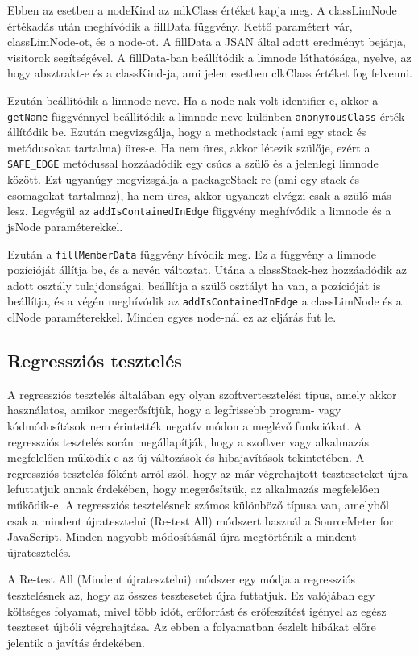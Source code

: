 Ebben az esetben a nodeKind az ndkClass értéket kapja meg.
A classLimNode értékadás után meghívódik a fillData függvény.
Kettő paramétert vár, classLimNode-ot, és a node-ot.
A fillData a JSAN által adott eredményt bejárja, visitorok segítségével.
A fillData-ban beállítódik a limnode láthatósága, nyelve, az hogy absztrakt-e és a classKind-ja, ami jelen esetben clkClass értéket fog felvenni.

Ezután beállítódik a limnode neve. Ha a node-nak volt identifier-e, akkor a \texttt{getName} függvénnyel beállítódik a limnode neve különben \texttt{anonymousClass} érték állítódik be.
Ezután megvizsgálja, hogy a methodstack (ami egy stack és metódusokat tartalma) üres-e.
Ha nem üres, akkor létezik szülője, ezért a \texttt{SAFE\_EDGE} metódussal hozzáadódik egy csúcs a szülő és a jelenlegi limnode között.
Ezt ugyanúgy megvizsgálja a  packageStack-re (ami egy stack és csomagokat tartalmaz), ha nem üres, akkor ugyanezt elvégzi csak a szülő más lesz.
Legvégül az \texttt{addIsContainedInEdge} függvény meghívódik a limnode és a jsNode paraméterekkel.


Ezután a \texttt{fillMemberData} függvény hívódik meg.
Ez a függvény a limnode pozícióját állítja be, és a nevén változtat.
Utána a classStack-hez hozzáadódik az adott osztály tulajdonságai, beállítja a szülő osztályt ha van, a pozícióját is beállítja, és a végén meghívódik az \texttt{addIsContainedInEdge} a classLimNode és a clNode paraméterekkel.
Minden egyes node-nál ez az eljárás fut le.

\subsection{Regressziós tesztelés}
A regressziós tesztelés általában egy olyan szoftvertesztelési típus, amely akkor használatos, amikor megerősítjük, hogy a legfrissebb program- vagy kódmódosítások nem érintették negatív módon a meglévő funkciókat.
A regressziós tesztelés során megállapítják, hogy a szoftver vagy alkalmazás megfelelően működik-e az új változások és hibajavítások tekintetében.
A regressziós tesztelés főként arról szól, hogy az már végrehajtott teszteseteket újra lefuttatjuk annak érdekében, hogy megerősítsük, az alkalmazás megfelelően működik-e.
A regressziós tesztelésnek számos különböző típusa van, amelyből csak a mindent újratesztelni (Re-test All) módszert használ a SourceMeter for JavaScript. Minden nagyobb módosításnál újra megtörténik a mindent újratesztelés.

A Re-test All (Mindent újratesztelni) módszer egy módja a regressziós tesztelésnek az, hogy az összes tesztesetet újra futtatjuk.
Ez valójában egy költséges folyamat, mivel több időt, erőforrást és erőfeszítést igényel az egész teszteset újbóli végrehajtása.
Az ebben a folyamatban észlelt hibákat előre jelentik a javítás érdekében.
